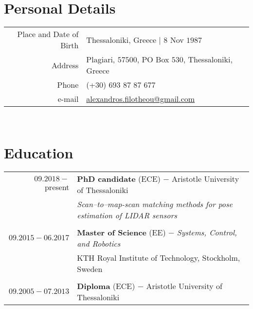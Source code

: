 \documentclass[a4paper,10pt,twoside]{article}
\begin{document}


\par{\bigskip\par}
\vspace{1cm}

\section{Personal Details}

\begin{tabular}{rp{10cm}}
Place and Date of Birth 	& Thessaloniki, Greece | $8$ Nov $1987$ \\
Address            			  & Plagiari, $57500$, PO Box $530$, Thessaloniki, Greece \\
Phone						          & (+30) 693 87 87 677 \\
e-mail                    & \href{mailto:alexandros.filotheou@gmail.com}{alexandros.filotheou@gmail.com}
\end{tabular}\\


\section{Education}

\begin{tabular}{rp{12cm}}
$09.2018 -$ present & \textbf{PhD candidate} (ECE) $-$ Aristotle University of Thessaloniki \\
                    & \textit{Scan--to--map-scan matching methods for pose estimation of LIDAR sensors} \\
&\\
$09.2015 - 06.2017$ & \textbf{Master of Science} (EE) $-$ \textit{Systems, Control, and Robotics}\\
                    & KTH Royal Institute of Technology, Stockholm, Sweden\\
&\\
$09.2005 - 07.2013$ & \textbf{Diploma} (ECE) $-$ Aristotle University of Thessaloniki\\
\end{tabular}\\
\end{document}
